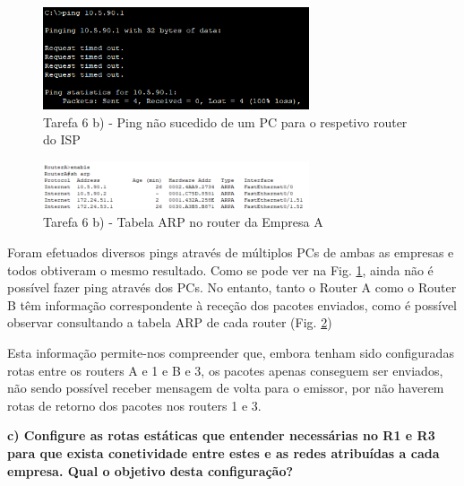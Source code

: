 \documentclass[11pt,english, openright, oneside]{book}
\begin{document}
\begin{figure}[H]
    \centering
    \includegraphics[width=0.7\textwidth]{imagens/Tarefa6/6.b_PC_Ping.png}
    \caption{Tarefa 6 b) - Ping não sucedido de um PC para o respetivo router do ISP}
    \label{fig:6.b_ping}
\end{figure}
\vspace{0.4cm}

\begin{figure}[H]
    \centering
    \includegraphics[width=0.7\textwidth]{imagens/Tarefa6/6.b_Router_ARP.png}
    \caption{Tarefa 6 b) - Tabela ARP no router da Empresa A}
    \label{fig:6.b_arp}
\end{figure}
\vspace{0.4cm}

Foram efetuados diversos pings através de múltiplos PCs de ambas as empresas e todos obtiveram o mesmo resultado. Como se pode ver na Fig. \ref{fig:6.b_ping}, ainda não é possível fazer ping através dos PCs. No entanto, tanto o Router A como o Router B têm informação correspondente à receção dos pacotes enviados, como é possível observar consultando a tabela ARP de cada router (Fig. \ref{fig:6.b_arp}) \par \vspace{0.2cm}

Esta informação permite-nos compreender que, embora tenham sido configuradas rotas entre os routers A e 1 e B e 3, os pacotes apenas conseguem ser enviados, não sendo possível receber mensagem de volta para o emissor, por não haverem rotas de retorno dos pacotes nos routers 1 e 3. \par \vspace{0.2cm}

\vspace{0.8cm}

\pagebreak
\textbf{c) Configure as rotas estáticas que entender necessárias no R1 e R3 para que exista conetividade entre estes e as redes atribuídas a cada empresa. Qual o objetivo desta configuração?}
\vspace{0.2cm}
\end{document}
